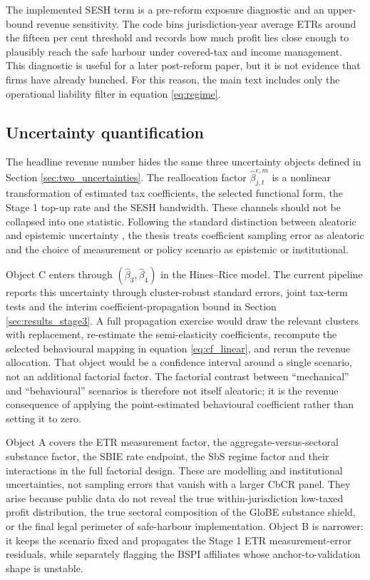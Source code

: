 \documentclass[11pt,a4paper]{article}
\begin{document}
The implemented SESH term is a pre-reform exposure diagnostic and an upper-bound revenue sensitivity. The code bins jurisdiction-year average ETRs around the fifteen per cent threshold and records how much profit lies close enough to plausibly reach the safe harbour under covered-tax and income management. This diagnostic is useful for a later post-reform paper, but it is not evidence that firms have already bunched. For this reason, the main text includes only the operational liability filter in equation \eqref{eq:regime}.

\subsection{Uncertainty quantification}\label{sec:beta_uncertainty}

The headline revenue number hides the same three uncertainty objects defined in Section \ref{sec:two_uncertainties}. The reallocation factor $\hat{\beta}_{j,t}^{e,m}$ is a nonlinear transformation of estimated tax coefficients, the selected functional form, the Stage 1 top-up rate and the SESH bandwidth. These channels should not be collapsed into one statistic. Following the standard distinction between aleatoric and epistemic uncertainty \citep{hullermeier2021}, the thesis treats coefficient sampling error as aleatoric and the choice of measurement or policy scenario as epistemic or institutional.

Object C enters through $(\hat{\beta}_3,\hat{\beta}_4)$ in the Hines--Rice model. The current pipeline reports this uncertainty through cluster-robust standard errors, joint tax-term tests and the interim coefficient-propagation bound in Section \ref{sec:results_stage3}. A full propagation exercise would draw the relevant clusters with replacement, re-estimate the semi-elasticity coefficients, recompute the selected behavioural mapping in equation \eqref{eq:cf_linear}, and rerun the revenue allocation. That object would be a confidence interval around a single scenario, not an additional factorial factor. The factorial contrast between ``mechanical'' and ``behavioural'' scenarios is therefore not itself aleatoric; it is the revenue consequence of applying the point-estimated behavioural coefficient rather than setting it to zero.

Object A covers the ETR measurement factor, the aggregate-versus-sectoral substance factor, the SBIE rate endpoint, the SbS regime factor and their interactions in the full factorial design. These are modelling and institutional uncertainties, not sampling errors that vanish with a larger CbCR panel. They arise because public data do not reveal the true within-jurisdiction low-taxed profit distribution, the true sectoral composition of the GloBE substance shield, or the final legal perimeter of safe-harbour implementation. Object B is narrower: it keeps the scenario fixed and propagates the Stage 1 ETR measurement-error residuals, while separately flagging the BSPI affiliates whose anchor-to-validation shape is unstable.
\end{document}
